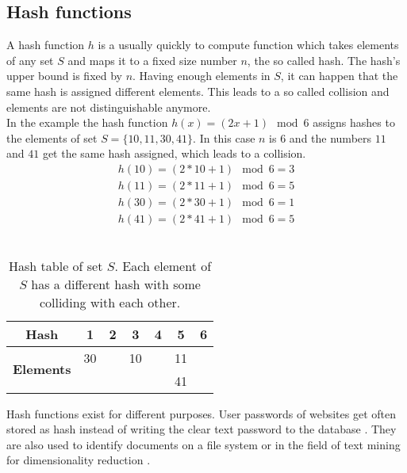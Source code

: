 \subsection{Hash functions}
A hash function $ h $ is a usually quickly to compute function which takes  elements of any set $ S $ and maps it to a fixed size number $ n $, the so called hash. The hash's upper bound is fixed by $ n $. Having enough elements in $ S $, it can happen that the same hash is assigned different elements. This leads to a so called collision and elements are not distinguishable anymore.\\


In the example the hash function $ h(x) = (2x+1) \mod 6 $ assigns hashes to the elements of set $ S = \{ 10,11,30,41 \} $.  In this case $ n $ is $ 6 $ and the numbers $ 11 $ and $ 41 $ get the same hash assigned, which leads to a collision.\\

\begin{equation}
    \begin{split}
        h(10) = (2 * 10 + 1) \mod 6 = 3  \\
        h(11) = (2 * 11 + 1) \mod 6 = 5 \\
        h(30) = (2 * 30 + 1) \mod 6 = 1 \\
        h(41) = (2 * 41 + 1) \mod 6 = 5
    \end{split}
\end{equation}\\

\begin{table}[H]
    \centering
    \begin{tabular}{| c | c | c | c | c | c | c |}
        \hline
        \textbf{Hash} & \textbf{1} & \textbf{2} & \textbf{3} & \textbf{4} & \textbf{5} & \textbf{6}  \\
        \hline
        \multirow{2}{*}{\textbf{Elements}}   & 30 &    & 10 &    & 11 & \\
        &    &    &    &    & 41  &\\
        \hline
    \end{tabular}    
    \caption{Hash table of set $ S $. Each element of $ S $ has a different  hash with some colliding with each other.}
\end{table}

Hash functions exist for different purposes. User passwords of websites get often stored as hash instead of writing the clear text password to the database \cite{cryptographicHashFunctions}. They are also used to identify documents on a file system or in the field of text mining for dimensionality reduction \cite{practicalHashFunctions}.\\

